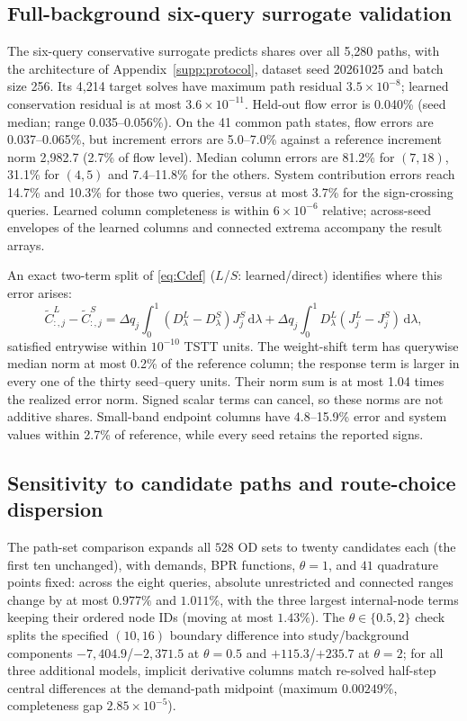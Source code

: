 \subsection{Full-background six-query surrogate validation}\label{supp:fullbgsurrogate}
The six-query conservative surrogate predicts shares over all 5,280
paths, with the architecture of Appendix~\ref{supp:protocol}, dataset
seed 20261025 and batch size 256. Its 4,214 target solves have maximum
path residual $3.5\times10^{-8}$; learned conservation residual is at
most $3.6\times10^{-11}$. Held-out flow error is 0.040\% (seed median;
range 0.035--0.056\%). On the 41 common path states, flow errors are
0.037--0.065\%, but increment errors are 5.0--7.0\% against a reference
increment norm 2,982.7 (2.7\% of flow level). Median column errors are
81.2\% for $(7,18)$, 31.1\% for $(4,5)$ and 7.4--11.8\% for the
others. System contribution errors reach 14.7\% and 10.3\% for those
two queries, versus at most 3.7\% for the sign-crossing queries.
Learned column completeness is within $6\times10^{-6}$ relative;
across-seed envelopes of the learned columns and connected extrema
accompany the result arrays.

An exact two-term split of \eqref{eq:Cdef} ($L$/$S$: learned/direct)
identifies where this error arises:
\begin{equation}
\widetilde C_{:,j}^{L}-\widetilde C_{:,j}^{S}
=\Delta q_j\int_0^1(D_\lambda^{L}-D_\lambda^{S})J_j^{S}\,\mathrm{d}\lambda
+\Delta q_j\int_0^1D_\lambda^{L}(J_j^{L}-J_j^{S})\,\mathrm{d}\lambda,
\label{eq:coldecomp}
\end{equation}
satisfied entrywise within $10^{-10}$ TSTT units. The weight-shift
term has querywise median norm at most 0.2\% of the reference column;
the response term is larger in every one of the thirty seed--query
units. Their norm sum is at most 1.04 times the realized error norm.
Signed scalar terms can cancel, so these norms are not additive shares.
Small-band endpoint columns have 4.8--15.9\% error and system values
within 2.7\% of reference, while every seed retains the reported signs.

\subsection{Sensitivity to candidate paths and route-choice dispersion}\label{supp:coverage}
The path-set comparison expands all $528$ OD sets to twenty
candidates each (the first ten unchanged), with demands, BPR
functions, $\theta=1$, and $41$ quadrature points fixed: across the
eight queries, absolute unrestricted and connected ranges change by
at most $0.977\%$ and $1.011\%$, with the three largest
internal-node terms keeping their ordered node IDs (moving at most
$1.43\%$). The $\theta\in\{0.5,2\}$ check splits the specified
$(10,16)$ boundary difference into study/background components
$-7{,}404.9$/$-2{,}371.5$ at $\theta=0.5$ and $+115.3$/$+235.7$ at
$\theta=2$; for all three additional models, implicit derivative
columns match re-solved half-step central differences at the
demand-path midpoint (maximum $0.00249\%$, completeness gap
$2.85\times10^{-5}$).


